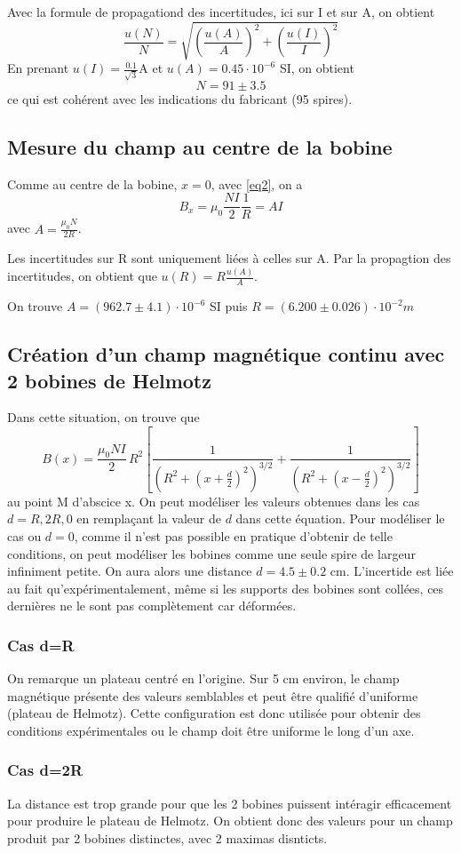 \documentclass[a4paper,9pt,french]{scrartcl}
\begin{document}
Avec la formule de propagationd des incertitudes, ici sur I et sur A, on obtient \[\frac{u(N)}{N} = \sqrt{ \left( \frac{u(A)}{A} \right)^2 + \left( \frac{u(I)}{I} \right)^2 }\]
En prenant \(u(I) = \frac{0.1}{\sqrt{3}}\)A et \(u(A) = 0.45\cdot10^{-6}\) SI, on obtient \[N = 91\pm3.5\] ce qui est cohérent avec les indications du fabricant (95 spires).
\subsection{Mesure du champ au centre de la bobine}
Comme au centre de la bobine, \(x=0\), avec \ref{eq2}, on a \[B_x = \mu_0 \frac{NI}{2}\frac{1}{R} = A I\] avec \(A = \frac{\mu_0N}{2R}\).

Les incertitudes sur R sont uniquement liées à celles sur A. Par la propagtion des incertitudes, on obtient que \(u(R) = R\frac{u(A)}{A}\).

On trouve \(A = (962.7\pm4.1)\cdot 10^{-6}\) SI puis \(R = (6.200\pm0.026)\cdot10^{-2}m\)
\subsection{Création d'un champ magnétique continu avec 2 bobines de Helmotz}
Dans cette situation, on trouve que \begin{equation}B(x)=\frac{\mu_0 N I}{2}\,R^2\left[ \frac{1}{\left(R^2+\left(x+\frac{d}{2}\right)^2\right)^{3/2}} +\frac{1}{\left(R^2+\left(x-\frac{d}{2}\right)^2\right)^{3/2}} \right]\end{equation} au point M d'abscice x. On peut modéliser les valeurs obtenues dans les cas \(d = R, 2R, 0\) en remplaçant la valeur de $d$ dans cette équation. Pour modéliser le cas ou \(d=0\), comme il n'est pas possible en pratique d'obtenir de telle conditions, on peut modéliser les bobines comme une seule spire de largeur infiniment petite. On aura alors une distance \(d=4.5\pm 0.2\) cm. L'incertide est liée au fait qu'expérimentalement, m\^eme si les supports des bobines sont collées, ces dernières ne le sont pas complètement car déformées.
\subsubsection{Cas d=R}
On remarque un plateau centré en l'origine. Sur 5 cm environ, le champ magnétique présente des valeurs semblables et peut \^etre qualifié d'uniforme (plateau de Helmotz). Cette configuration est donc utilisée pour obtenir des conditions expérimentales ou le champ doit \^etre uniforme le long d'un axe.
\subsubsection{Cas d=2R}
La distance est trop grande pour que les 2 bobines puissent intéragir efficacement pour produire le plateau de Helmotz. On obtient donc des valeurs pour un champ produit par 2 bobines distinctes, avec 2 maximas disnticts.
\end{document}
